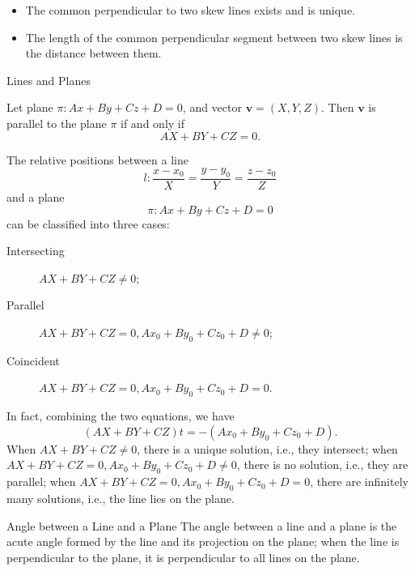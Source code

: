 \documentclass[11pt]{../../TexTemplate/elegantbook} %
\begin{document}
\begin{property}
    \begin{itemize}
        \item The common perpendicular to two skew lines exists and is unique.
        \item The length of the common perpendicular segment between two skew lines is the distance between them.
    \end{itemize}
\end{property}


\begin{leftbarTitle}{Lines and Planes}\end{leftbarTitle}
\begin{proposition}
    Let plane \(\pi: A x + B y + C z + D = 0\),
    and vector \(\mathbf{v} = (X, Y, Z)\).
    Then \(\mathbf{v}\) is parallel to the plane \(\pi\) if and only if
    \[
    AX + BY + CZ = 0.
    \]
\end{proposition}

The relative positions between a line 
\[
l: \frac{x-x_{0}}{X} = \frac{y-y_{0}}{Y} = \frac{z-z_{0}}{Z}
\] 
and a plane
\[
\pi: A x + B y + C z + D = 0
\]
can be classified into three cases:
\begin{description}
    \item[Intersecting] \(A X + B Y + C Z \neq 0\);
    \item[Parallel] \(A X + B Y + C Z = 0, A x_{0} + B y_{0} + C z_{0} + D \neq 0\);
    \item[Coincident] \(A X + B Y + C Z = 0, A x_{0} + B y_{0} + C z_{0} + D = 0\).
\end{description}

\begin{remark}
    In fact, combining the two equations, we have 
    \[
    (AX+BY+CZ)t=-(Ax_{0}+By_{0}+Cz_{0}+D).
    \]
    When \(AX+BY+CZ\ne0\), there is a unique solution, i.e., they intersect; \newline
    when \(AX+BY+CZ=0,Ax_{0}+By_{0}+Cz_{0}+D\ne0\), there is no solution, i.e., they are parallel; \newline
    when \(AX+BY+CZ=0,Ax_{0}+By_{0}+Cz_{0}+D=0\), there are infinitely many solutions, i.e., the line lies on the plane.
\end{remark}

\begin{definition}{Angle between a Line and a Plane}
    The angle between a line and a plane is the acute angle formed by the line and its projection on the plane; 
    when the line is perpendicular to the plane, it is perpendicular to all lines on the plane.
\end{definition}
\end{document}
